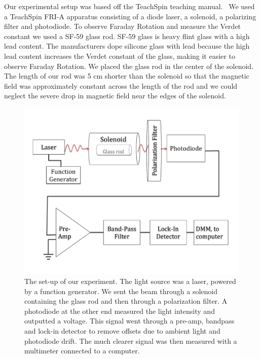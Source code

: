 \documentclass[prb,preprint]{revtex4-1}
\begin{document}
Our experimental setup was based off the TeachSpin teaching manual.~\cite{teachspin} We used a TeachSpin FRI-A apparatus consisting of a diode laser, a solenoid, a polarizing filter and photodiode. To observe Faraday Rotation and measure the Verdet constant we used a SF-59 glass rod. SF-59 glass is heavy flint glass with a high lead content. The manufacturers dope silicone glass with lead because the high lead content increases the Verdet constant of the glass, making it easier to observe Faraday Rotation.\cite{opticalglass} We placed the glass rod in the center of the solenoid. The length of our rod was 5 cm shorter than the solenoid so that the magnetic field was approximately constant across the length of the rod and we could neglect the severe drop in magnetic field near the edges of the solenoid. 

\begin{figure}[h!]
\centering
\includegraphics[width=6in]{Faraday_lab_set-up.pdf}
\caption{The set-up of our experiment. The light source was a laser, powered by a function generator. We sent the beam through a solenoid containing the glass rod and then through a polarization filter. A photodiode at the other end measured the light intensity and outputted a voltage. This signal went through a pre-amp, bandpass and lock-in detector to remove offsets due to ambient light and photodiode drift. The much clearer signal was then measured with a multimeter connected to a computer.}
\label{set-up}
\end{figure}
\end{document}
